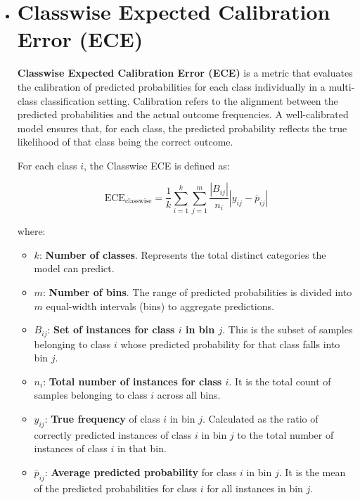 \begin{itemize}
\item \section{Classwise Expected Calibration Error (ECE)}
\label{subsubsec:ece_classwise}

\textbf{Classwise Expected Calibration Error (ECE)} is a metric that evaluates the calibration of predicted probabilities for each class individually in a multi-class classification setting. Calibration refers to the alignment between the predicted probabilities and the actual outcome frequencies. A well-calibrated model ensures that, for each class, the predicted probability reflects the true likelihood of that class being the correct outcome.

For each class \( i \), the Classwise ECE is defined as:

\[
    \text{ECE}_{\text{classwise}} = \frac{1}{k} \sum_{i=1}^{k} \sum_{j=1}^{m} \frac{|B_{ij}|}{n_i} \left| y_{ij} - \bar{p}_{ij} \right|
    \label{eq:ece_classwise}
\]

where:

\begin{itemize}
    \item \( k \): \textbf{Number of classes}. Represents the total distinct categories the model can predict.
    \item \( m \): \textbf{Number of bins}. The range of predicted probabilities is divided into \( m \) equal-width intervals (bins) to aggregate predictions.
    \item \( B_{ij} \): \textbf{Set of instances for class \( i \) in bin \( j \)}. This is the subset of samples belonging to class \( i \) whose predicted probability for that class falls into bin \( j \).
    \item \( n_i \): \textbf{Total number of instances for class \( i \)}. It is the total count of samples belonging to class \( i \) across all bins.
    \item \( y_{ij} \): \textbf{True frequency} of class \( i \) in bin \( j \). Calculated as the ratio of correctly predicted instances of class \( i \) in bin \( j \) to the total number of instances of class \( i \) in that bin.
    \item \( \bar{p}_{ij} \): \textbf{Average predicted probability} for class \( i \) in bin \( j \). It is the mean of the predicted probabilities for class \( i \) for all instances in bin \( j \).
\end{itemize}


\end{itemize}
